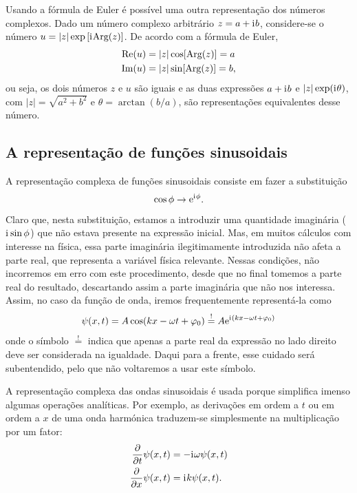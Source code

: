 Usando a fórmula de Euler é possível uma outra representação dos números
complexos. Dado um número complexo arbitrário $ z=a+\text{i}\mkern1mu b$, considere-se o
número $ u = | z|\exp\left[\text{i}\mkern1mu\text{Arg}( z)\right]$. De
acordo com a fórmula de Euler, 
\begin{align*}
  \text{Re}( u)&=| z|\cos[\text{Arg}( z)]=a\\
  \text{Im}( u)&=| z|\sin[\text{Arg}( z)]=b,
\end{align*}
ou seja, os dois números $ z$ e $ u$ são iguais e as duas expressões
$a+\text{i}\mkern1mu b$ e $| z|\exp(\text{i}\mkern1mu\theta)$, com
$| z|=\sqrt{a^2+b^2}$ e $\theta=\arctan(b/a)$, são representações
equivalentes desse número.

\subsection{A representação de funções sinusoidais}
\label{sec:complexharm}
A representação complexa de funções sinusoidais consiste em fazer a substituição
\begin{equation*}
  \cos\phi \rightarrow \text{e}^{\text{i}\mkern1mu \phi}.
\end{equation*}
Claro que, nesta substituição, estamos a introduzir uma quantidade imaginária
($\text{i}\mkern1mu\sin\phi$) que não estava presente na expressão inicial. Mas, em muitos
cálculos com interesse na física, essa parte imaginária ilegitimamente
introduzida não afeta a parte real, que representa a variável física relevante.
Nessas condições, não incorremos em erro com este procedimento, desde que no
final tomemos a parte real do resultado, descartando assim a parte imaginária
que não nos interessa. Assim, no caso da função de onda, iremos frequentemente
representá-la como
\begin{equation*}
  \psi(x,t)=A\cos(kx-\omega t+\varphi_0)
    \stackrel{!}{=}A\text{e}^{\text{i}\mkern1mu(kx-\omega t+\varphi_0)}
\end{equation*}
onde o símbolo $\stackrel{!}{=}$ indica que apenas a parte real da expressão no
lado direito deve ser considerada na igualdade. Daqui para a frente, esse
cuidado será subentendido, pelo que não voltaremos a usar este símbolo.

A representação complexa das ondas sinusoidais é usada porque simplifica imenso
algumas operações analíticas. Por exemplo, as derivações em ordem a $t$ ou em
ordem a $x$ de uma onda harmónica traduzem-se simplesmente na multiplicação por
um fator:
\begin{align*}
  \frac{\partial }{\partial t}\psi(x,t)&=-\text{i}\mkern1mu\omega\psi(x,t)\\
  \frac{\partial }{\partial x}\psi(x,t)&=\text{i}\mkern1mu k\psi(x,t).
\end{align*}

